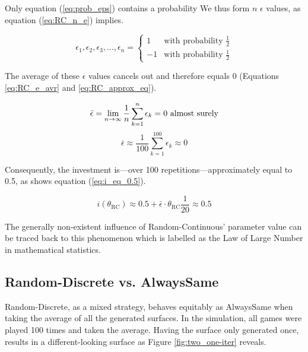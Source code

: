 \documentclass[11pt]{article}
\begin{document}
	\noindent
	Only equation (\ref{eq:prob_eps}) contains a probability
	We thus form $n$ $\epsilon$ values, as equation (\ref{eq:RC_n_e}) implies.

	\begin{equation}
		\epsilon_1, \epsilon_2, \epsilon_3, \dots, \epsilon_n = 
		\begin{cases}
		  1 & \text{with probability } \frac{1}{2}\\
		 -1 & \text{with probability } \frac{1}{2} 
		\end{cases}
		\label{eq:RC_n_e}
	\end{equation}

	\noindent	
	The average of these $\epsilon$ values cancels out and therefore equals 0 (Equations \ref{eq:RC_e_avr} and \ref{eq:RC_approx_eq}).

	\begin{equation}
		\bar \epsilon = \lim_{n\to\infty} \frac{1}{n} \sum_{k=1}^{n} \epsilon_k = 0 \text{ almost surely}\\
		\label{eq:RC_e_avr}
	\end{equation}
	\begin{equation}
		\bar \epsilon \approx \frac{1}{100} \sum_{k=1}^{100} \epsilon_k \approx 0
		\label{eq:RC_approx_eq}
	\end{equation}

	\noindent
	Consequently, the investment is---over 100 repetitions---approximately equal to 0.5, as shows equation (\ref{eq:i_eq_0.5}).

	\begin{equation}
		i(\theta_{\mathrm{RC}}) \approx 0.5 + \bar \epsilon \cdot \theta_{\mathrm{RC}} \frac{1}{20} \approx 0.5
		\label{eq:i_eq_0.5}
	\end{equation}

	\noindent
	The generally non-existent influence of Random-Continuous' parameter value can be traced back to this phenomenon which is labelled as the Law of Large Number in mathematical statistics.


\subsection{Random-Discrete vs. AlwaysSame} \label{sec:RndD_vs_AlwS}
	
	Random-Discrete, as a mixed strategy, behaves equitably as AlwaysSame when taking the average of all the generated surfaces.
	In the simulation, all games were played 100 times and taken the average.
	Having the surface only generated once, results in a different-looking surface as Figure \ref{fig:two_one-iter} reveals.\\
\end{document}
